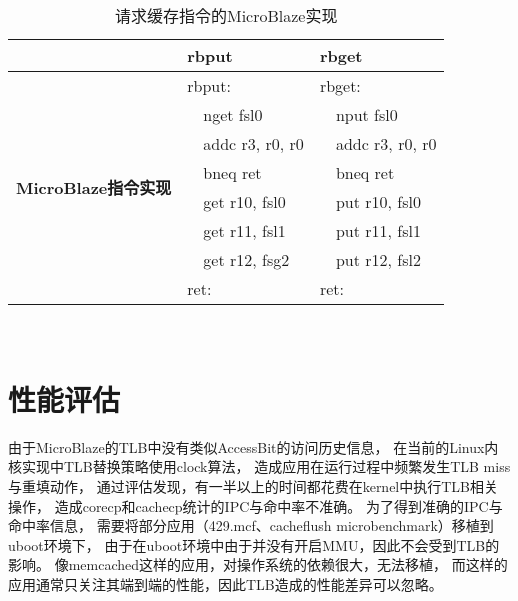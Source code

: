 \begin{table}[tb]
  \centering
  \begin{minipage}[t]{0.6\linewidth}
  \caption{请求缓存指令的MicroBlaze实现}
  \label{tab:pard-dp-isa-impl}
    \begin{tabular*}{\linewidth}{lp{0.5cm}lp{0.5cm}l}
      \toprule[1.5pt]
       & \multicolumn{2}{l}{\textbf{rbput}} & \multicolumn{2}{l}{\textbf{rbget}} \\ 
      \midrule[1pt]

      \multirow{8}{2cm}{\textbf{MicroBlaze指令实现}} & \multicolumn{2}{l}{rbput:}   & \multicolumn{2}{l}{rbget:} \\
                                                   &  & nget fsl0                 &  & nput fsl0               \\
                                                   &  & addc r3, r0, r0           &  & addc r3, r0, r0         \\
                                                   &  & bneq ret                  &  & bneq ret                \\
                                                   &  & get r10, fsl0             &  & put r10, fsl0           \\
                                                   &  & get r11, fsl1             &  & put r11, fsl1           \\
                                                   &  & get r12, fsg2             &  & put r12, fsl2           \\
                                                   & \multicolumn{2}{l}{ret:}     & \multicolumn{2}{l}{ret:}   \\
      \bottomrule[1.5pt]
    \end{tabular*}\\[2pt]
  \end{minipage}
\end{table}


\section{性能评估}

由于MicroBlaze的TLB中没有类似AccessBit的访问历史信息，
在当前的Linux内核实现中TLB替换策略使用clock算法，
造成应用在运行过程中频繁发生TLB miss与重填动作，
通过评估发现，有一半以上的时间都花费在kernel中执行TLB相关操作，
造成corecp和cachecp统计的IPC与命中率不准确。
为了得到准确的IPC与命中率信息，
需要将部分应用（429.mcf、cacheflush microbenchmark）移植到uboot环境下，
由于在uboot环境中由于并没有开启MMU，因此不会受到TLB的影响。
像memcached这样的应用，对操作系统的依赖很大，无法移植，
而这样的应用通常只关注其端到端的性能，因此TLB造成的性能差异可以忽略。


